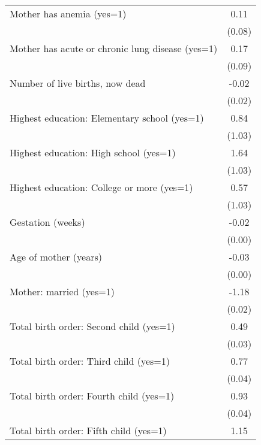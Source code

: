 {\begin{tabular}{l*{1}{c}}
Mother has anemia (yes=1)                         &        0.11\\
                                                  &      (0.08)\\
Mother has acute or chronic lung disease (yes=1)  &        0.17\\
                                                  &      (0.09)\\
Number of live births, now dead                   &       -0.02\\
                                                  &      (0.02)\\
Highest education: Elementary school (yes=1)      &        0.84\\
                                                  &      (1.03)\\
Highest education: High school (yes=1)            &        1.64\\
                                                  &      (1.03)\\
Highest education: College or more (yes=1)        &        0.57\\
                                                  &      (1.03)\\
Gestation (weeks)                                 &       -0.02\\
                                                  &      (0.00)\\
Age of mother (years)                             &       -0.03\\
                                                  &      (0.00)\\
Mother: married (yes=1)                           &       -1.18\\
                                                  &      (0.02)\\
Total birth order: Second child (yes=1)           &        0.49\\
                                                  &      (0.03)\\
Total birth order: Third child (yes=1)            &        0.77\\
                                                  &      (0.04)\\
Total birth order: Fourth child (yes=1)           &        0.93\\
                                                  &      (0.04)\\
Total birth order: Fifth child (yes=1)            &        1.15\\

\end{tabular}}
